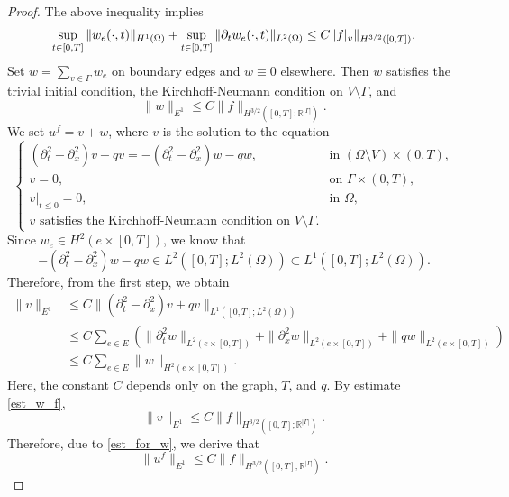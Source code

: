 \documentclass[11pt]{amsart}
\theoremstyle{definition}
\theoremstyle{plain}
\numberwithin{equation}{section}
\begin{document}
\begin{proof}
    The above inequality implies 
    \begin{equation*}
        \sup_{t\in [0,T]} \|w_e(\cdot, t)\|_{H^1(\Omega)} + \sup_{t\in [0,T]} \|\partial_t w_e(\cdot, t)\|_{L^2(\Omega)} \leq C \|f\arrowvert_v\|_{H^{3/2}([0,T])}.
    \end{equation*}
    Set $w=\sum_{v\in\Gamma} w_e$ on boundary edges and $w\equiv0$ elsewhere. Then $w$ satisfies the trivial initial condition, the Kirchhoff-Neumann condition on $V\setminus\Gamma$, and
    \begin{equation}\label{est_for_w}
        \|w\|_{E^1} \leq C \|f\|_{ H^{3/2}([0,T]; \mathbb{R}^{|\Gamma|})}.
    \end{equation}
    We set $u^f = v + w$, where $v$ is the solution to the equation
    \begin{equation*}
    \begin{cases}
        (\partial_t^2-\partial_x^2)v+qv=-(\partial_t^2-\partial_x^2)w - qw, & \text{in }(\Omega\setminus V)\times (0,T),\\
        v=0, & \text{on } \Gamma\times(0,T),\\
        v|_{t\leq 0}=0, & \text{in } \Omega,\\
        v \text{ satisfies the Kirchhoff-Neumann condition on } V\setminus\Gamma.
    \end{cases}
    \end{equation*}
    Since $w_e \in H^2(e\times [0,T])$, we know that 
    \begin{equation*}
        -(\partial_t^2-\partial_x^2)w - qw \in L^2([0,T]; L^2(\Omega)) \subset L^1([0,T]; L^2(\Omega)).
    \end{equation*}
    Therefore, from the first step, we obtain
    \begin{align*}
        \|v\|_{E^1} &\leq C \|(\partial_t^2-\partial_x^2)v+qv\|_{L^1([0,T]; L^2(\Omega))} \\
        & \leq C \sum_{e\in E} \left( \|\partial_t^2 w\|_{L^2(e\times [0,T])} + \|\partial_x^2 w\|_{L^2(e\times [0,T])} + \|q w\|_{L^2(e\times [0,T])}\right)\\
        & \leq C \sum_{e\in E} \|w\|_{H^2(e\times [0,T])}.
    \end{align*}
    Here, the constant $C$ depends only on the graph, $T$, and $q$. By estimate \eqref{est_w_f}, 
    \begin{equation}\label{est_for_v}
        \|v\|_{E^1} \leq C \|f\|_{ H^{3/2}([0,T]; \mathbb{R}^{|\Gamma|})}.
    \end{equation}
    Therefore, due to \eqref{est_for_w}, we derive that
    \begin{equation}\label{est_uf}
        \|u^f\|_{E^1} \leq C \|f\|_{ H^{3/2}([0,T]; \mathbb{R}^{|\Gamma|})}.
    \end{equation}



\end{proof}
\end{document}
